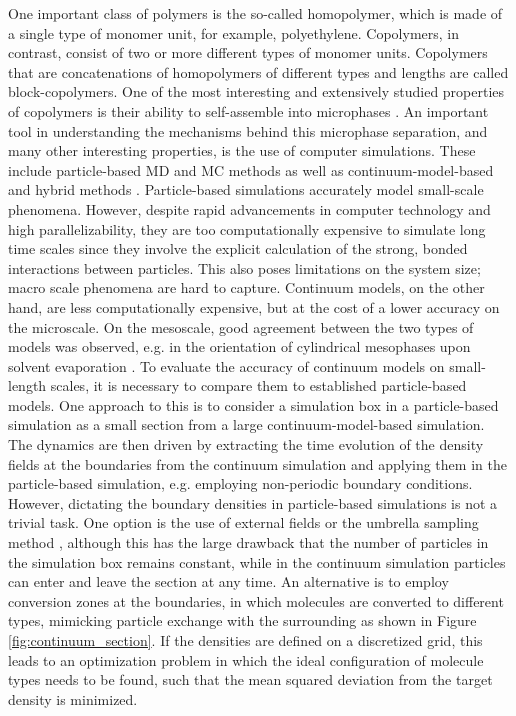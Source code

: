 \documentclass[bachelor,       %
               twoside,        %
               BCOR10mm,       %
               ngerman, english %
               ]{GAUBM}
\begin{document}
One important class of polymers is the so-called homopolymer, which is made of a single type of monomer unit, for example, polyethylene. Copolymers, in contrast, consist of two or more different types of monomer units. Copolymers that are concatenations of homopolymers of different types and lengths are called block-copolymers. One of the most interesting and extensively studied properties of copolymers is their ability to self-assemble into microphases \cite{leibler1980theory}. An important tool in understanding the mechanisms behind this microphase separation, and many other interesting properties, is the use of computer simulations. These include particle-based \ac{MD} and \ac{MC} methods as well as continuum-model-based and hybrid methods \cite{Shuanhu2017}. Particle-based simulations accurately model small-scale phenomena. However, despite rapid advancements in computer technology and high parallelizability, they are too computationally expensive to simulate long time scales since they involve the explicit calculation of the strong, bonded interactions between particles. This also poses limitations on the system size; macro scale phenomena are hard to capture. Continuum models, on the other hand, are less computationally expensive, but at the cost of a lower accuracy on the microscale. On the mesoscale, good agreement between the two types of models was observed, e.g. in the orientation of cylindrical mesophases upon solvent evaporation \cite{Dreyer22}. To evaluate the accuracy of continuum models on small-length scales, it is necessary to compare them to established particle-based models. One approach to this is to consider a simulation box in a particle-based simulation as a small section from a large continuum-model-based simulation. The dynamics are then driven by extracting the time evolution of the density fields at the boundaries from the continuum simulation and applying them in the particle-based simulation, e.g. employing non-periodic boundary conditions. However, dictating the boundary densities in particle-based simulations is not a trivial task. One option is the use of external fields or the umbrella sampling method \cite{glenn74}, although this has the large drawback that the number of particles in the simulation box remains constant, while in the continuum simulation particles can enter and leave the section at any time. An alternative is to employ conversion zones at the boundaries, in which molecules are converted to different types, mimicking particle exchange with the surrounding as shown in Figure \ref{fig:continuum_section}. If the densities are defined on a discretized grid, this leads to an optimization problem in which the ideal configuration of molecule types needs to be found, such that the mean squared deviation from the target density is minimized. \\
\end{document}
